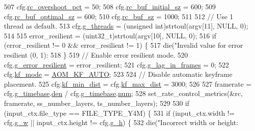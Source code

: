\begin{DoxyCodeInclude}
{{{{{{{{{{{{{507   cfg.\hyperlink{structaom__codec__enc__cfg_ad57c8287bcacf2ca7230a3e11906b65c}{rc\_overshoot\_pct} = 50;
508   cfg.\hyperlink{structaom__codec__enc__cfg_a6c25595e7dfcdf3229c3f66c91224fcc}{rc\_buf\_initial\_sz} = 600;
509   cfg.\hyperlink{structaom__codec__enc__cfg_aa4d9838419e94e634a02d710da06c842}{rc\_buf\_optimal\_sz} = 600;
510   cfg.\hyperlink{structaom__codec__enc__cfg_a2eb74c50bbc22536248925cd92b746c2}{rc\_buf\_sz} = 1000;
511 
512   \textcolor{comment}{// Use 1 thread as default.}
513   cfg.\hyperlink{structaom__codec__enc__cfg_a55f56f04145e334cfa727df77d8378d4}{g\_threads} = (\textcolor{keywordtype}{unsigned} int)strtoul(argv[11], NULL, 0);
514 
515   error\_resilient = (uint32\_t)strtoul(argv[10], NULL, 0);
516   \textcolor{keywordflow}{if} (error\_resilient != 0 && error\_resilient != 1) \{
517     die(\textcolor{stringliteral}{"Invalid value for error resilient (0, 1): %
518   \}
519   \textcolor{comment}{// Enable error resilient mode.}
520   cfg.\hyperlink{structaom__codec__enc__cfg_a8f3763485bb1f6eea6466b2fe0da2304}{g\_error\_resilient} = error\_resilient;
521   cfg.\hyperlink{structaom__codec__enc__cfg_a614a49318f2011cc8735d7e51b910fa4}{g\_lag\_in\_frames} = 0;
522   cfg.\hyperlink{structaom__codec__enc__cfg_a3c1ea7f3ea90b9b8eab4c3f266ffacdc}{kf\_mode} = \hyperlink{group__encoder_ggac0498fc02cd368e6d9675cdb0bab5a84aea1965a235dea1b99d2b52145be35d4e}{AOM\_KF\_AUTO};
523 
524   \textcolor{comment}{// Disable automatic keyframe placement.}
525   cfg.\hyperlink{structaom__codec__enc__cfg_a5df0104b97c8ad18f8f1df492706a256}{kf\_min\_dist} = cfg.\hyperlink{structaom__codec__enc__cfg_a877936e8a60207e7eac223811af0c124}{kf\_max\_dist} = 3000;
526 
527   framerate = cfg.\hyperlink{structaom__codec__enc__cfg_a10664f1fc5b6ec29b77ee13efeeecdf7}{g\_timebase}.\hyperlink{structaom__rational_adeddf2ea01c12b7be66536e0a0fb92c5}{den} / cfg.\hyperlink{structaom__codec__enc__cfg_a10664f1fc5b6ec29b77ee13efeeecdf7}{g\_timebase}.\hyperlink{structaom__rational_a7b48174411798c780a15f132c4650839}{num};
528   set\_rate\_control\_metrics(&rc, framerate, ss\_number\_layers, ts\_number\_layers);
529 
530   \textcolor{keywordflow}{if} (input\_ctx.file\_type == FILE\_TYPE\_Y4M) \{
531     \textcolor{keywordflow}{if} (input\_ctx.width != cfg.\hyperlink{structaom__codec__enc__cfg_a80cb459c5ef3c7e1516f617c4c9d6eab}{g\_w} || input\_ctx.height != cfg.\hyperlink{structaom__codec__enc__cfg_a37b0f57b63bec8d133df8901d4407ee6}{g\_h}) \{
532       die(\textcolor{stringliteral}{"Incorrect width or height: %
}}}}}}}}}}}}}}}
\end{DoxyCodeInclude}
